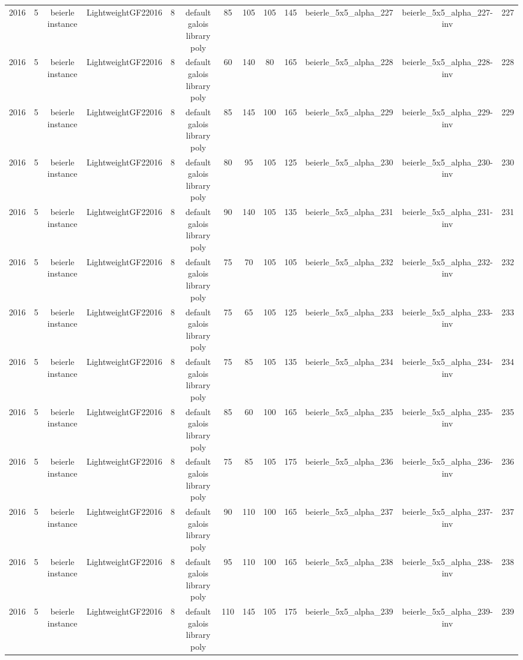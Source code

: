 \begin{tabular}{c c c c c c c c c c c c c}
2016 & 5 & beierle instance & LightweightGF22016 & 8 & default galois library poly & 85 & 105 & 105 & 145 & beierle_5x5_alpha_227 & beierle_5x5_alpha_227-inv & 227 \\
2016 & 5 & beierle instance & LightweightGF22016 & 8 & default galois library poly & 60 & 140 & 80 & 165 & beierle_5x5_alpha_228 & beierle_5x5_alpha_228-inv & 228 \\
2016 & 5 & beierle instance & LightweightGF22016 & 8 & default galois library poly & 85 & 145 & 100 & 165 & beierle_5x5_alpha_229 & beierle_5x5_alpha_229-inv & 229 \\
2016 & 5 & beierle instance & LightweightGF22016 & 8 & default galois library poly & 80 & 95 & 105 & 125 & beierle_5x5_alpha_230 & beierle_5x5_alpha_230-inv & 230 \\
2016 & 5 & beierle instance & LightweightGF22016 & 8 & default galois library poly & 90 & 140 & 105 & 135 & beierle_5x5_alpha_231 & beierle_5x5_alpha_231-inv & 231 \\
2016 & 5 & beierle instance & LightweightGF22016 & 8 & default galois library poly & 75 & 70 & 105 & 105 & beierle_5x5_alpha_232 & beierle_5x5_alpha_232-inv & 232 \\
2016 & 5 & beierle instance & LightweightGF22016 & 8 & default galois library poly & 75 & 65 & 105 & 125 & beierle_5x5_alpha_233 & beierle_5x5_alpha_233-inv & 233 \\
2016 & 5 & beierle instance & LightweightGF22016 & 8 & default galois library poly & 75 & 85 & 105 & 135 & beierle_5x5_alpha_234 & beierle_5x5_alpha_234-inv & 234 \\
2016 & 5 & beierle instance & LightweightGF22016 & 8 & default galois library poly & 85 & 60 & 100 & 165 & beierle_5x5_alpha_235 & beierle_5x5_alpha_235-inv & 235 \\
2016 & 5 & beierle instance & LightweightGF22016 & 8 & default galois library poly & 75 & 85 & 105 & 175 & beierle_5x5_alpha_236 & beierle_5x5_alpha_236-inv & 236 \\
2016 & 5 & beierle instance & LightweightGF22016 & 8 & default galois library poly & 90 & 110 & 100 & 165 & beierle_5x5_alpha_237 & beierle_5x5_alpha_237-inv & 237 \\
2016 & 5 & beierle instance & LightweightGF22016 & 8 & default galois library poly & 95 & 110 & 100 & 165 & beierle_5x5_alpha_238 & beierle_5x5_alpha_238-inv & 238 \\
2016 & 5 & beierle instance & LightweightGF22016 & 8 & default galois library poly & 110 & 145 & 105 & 175 & beierle_5x5_alpha_239 & beierle_5x5_alpha_239-inv & 239 \\

\end{tabular}
